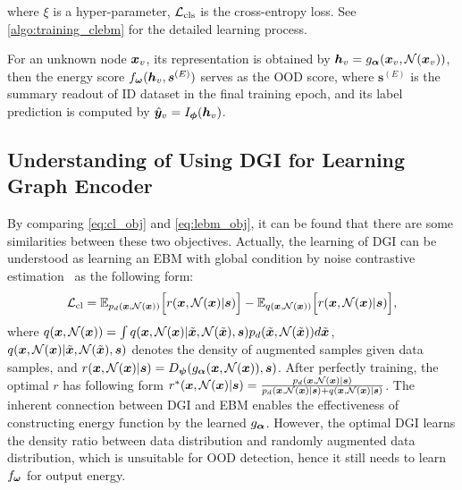 where $\xi$ is a hyper-parameter, $\mathcal{L}_{\text{cls}}$ is the cross-entropy loss. See \cref{algo:training_clebm} for the detailed learning process.

For an unknown node ${\bm{x}}_v$, its representation is obtained by ${\bm{h}}_v=g_{{\bm{\alpha}}}({\bm{x}}_v, \mathcal{N}({\bm{x}}_v))$, then the energy score $f_{{\bm{\omega}}}({\bm{h}}_v, \bm{s}^{(E)})$ serves as the OOD score, where $\bm{s}^{(E)}$ is the summary readout of ID dataset in the final training epoch, and its label prediction is computed by $\hat{{\bm{y}}}_v=I_{{\bm{\phi}}}({\bm{h}}_v)$. 

\subsection{Understanding of Using DGI for Learning Graph Encoder}
\label{sec:dgi_theory}
By comparing \cref{eq:cl_obj} and \cref{eq:lebm_obj}, it can be found that there are some similarities between these two objectives. Actually, the learning of DGI can be understood as learning an EBM with global condition by noise contrastive estimation~\citep{ncpvae,ncp} as the following form:
\vspace{-5pt}
\begin{equation}
    \notag
    \mathcal{L}_{\text{cl}} = {\mathbb{E}}_{p_d({\bm{x}},\mathcal{N}({\bm{x}}))} \Big[ r({\bm{x}},\mathcal{N}({\bm{x}})|\bm{s}) \Big] -  {\mathbb{E}}_{q({\bm{x}},\mathcal{N}({\bm{x}}))} \Big[ r({\bm{x}},\mathcal{N}({\bm{x}})|\bm{s}) \Big],
\end{equation}
where $q({\bm{x}},\mathcal{N}({\bm{x}})) = \int q({\bm{x}},\mathcal{N}({\bm{x}})| \Tilde{{\bm{x}}},\mathcal{N}(\Tilde{{\bm{x}}}),\bm{s})p_d(\Tilde{{\bm{x}}},\mathcal{N}(\Tilde{{\bm{x}}}))d\Tilde{{\bm{x}}}$, $q({\bm{x}},\mathcal{N}({\bm{x}})| \Tilde{{\bm{x}}},\mathcal{N}(\Tilde{{\bm{x}}}),\bm{s})$ denotes the density of augmented samples given data samples, and $r({\bm{x}},\mathcal{N}({\bm{x}})|\bm{s}) = D_{{\bm{\psi}}}( g_{\bm{\alpha}}({\bm{x}},\mathcal{N}({\bm{x}})), \bm{s})$. After perfectly training, the optimal $r$ has following form $r^*({\bm{x}},\mathcal{N}({\bm{x}})|\bm{s}) = \frac{p_d({\bm{x}},\mathcal{N}({\bm{x}})|\bm{s})}{p_d({\bm{x}},\mathcal{N}({\bm{x}})|\bm{s}) + q({\bm{x}},\mathcal{N}({\bm{x}})|\bm{s})}$. 
The inherent connection between DGI and EBM enables the effectiveness of constructing energy function by the learned $g_{\bm{\alpha}}$. However, the optimal DGI learns the density ratio between data distribution and randomly augmented data distribution, which is unsuitable for OOD detection, hence it still needs to learn $f_{\bm{\omega}}$ for output energy.
